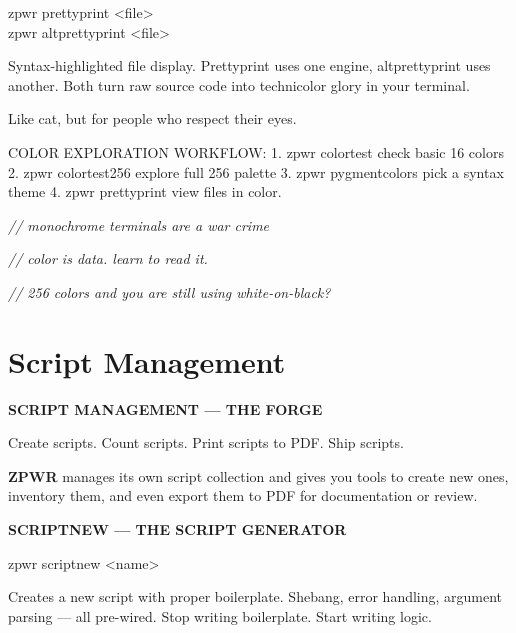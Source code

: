 \documentclass[11pt,a4paper,twoside]{book}
\begin{document}
\begin{codebox}
\color{neongreen}zpwr prettyprint <file>\\
\color{neongreen}zpwr altprettyprint <file>\\
\end{codebox}

Syntax-highlighted file display. Prettyprint uses one engine, altprettyprint uses another. Both turn raw source code into technicolor glory in your terminal.

Like cat, but for people who respect their eyes.

COLOR EXPLORATION WORKFLOW: 1. zpwr colortest        check basic 16 colors 2. zpwr colortest256     explore full 256 palette 3. zpwr pygmentcolors    pick a syntax theme 4. zpwr prettyprint      view files in color.

{\small\itshape\color{dimtext} // monochrome terminals are a war crime}

{\small\itshape\color{dimtext} // color is data. learn to read it.}

{\small\itshape\color{dimtext} // 256 colors and you are still using white-on-black?}


\vspace{16pt}

\section{Script Management}


\vspace{10pt}
{\large\bfseries\color{neoncyan} SCRIPT MANAGEMENT — THE FORGE}\vspace{6pt}

Create scripts. Count scripts. Print scripts to PDF. Ship scripts.

\textbf{ZPWR} manages its own script collection and gives you tools to create new ones, inventory them, and even export them to PDF for documentation or review.


\vspace{12pt}
{\bfseries\color{neonyellow} SCRIPTNEW — THE SCRIPT GENERATOR}\vspace{4pt}

\begin{codebox}
\color{neongreen}zpwr scriptnew <name>\\
\end{codebox}

Creates a new script with proper boilerplate. Shebang, error handling, argument parsing — all pre-wired. Stop writing boilerplate. Start writing logic.
\end{document}
